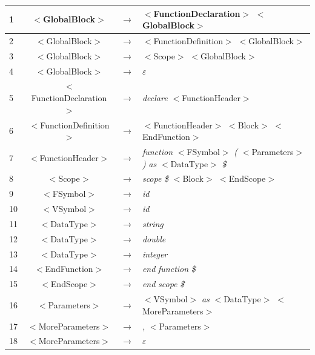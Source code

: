 \documentclass[10pt,a4paper,titlepage]{article}
\begin{document}
{\small
  \begin{center}
    \begin{tabular}{ | l | c  c  l | } \hline
      1  & $<$GlobalBlock$>$              & $\rightarrow$ & $<$FunctionDeclaration$>$ $<$GlobalBlock$>$ \\ \hline
      2  & $<$GlobalBlock$>$              & $\rightarrow$ & $<$FunctionDefinition$>$ $<$GlobalBlock$>$ \\ \hline
      3  & $<$GlobalBlock$>$              & $\rightarrow$ & $<$Scope$>$ $<$GlobalBlock$>$ \\ \hline
      4  & $<$GlobalBlock$>$              & $\rightarrow$ & $\varepsilon$ \\ \hline
      5  & $<$FunctionDeclaration$>$      & $\rightarrow$ & {\it declare} $<$FunctionHeader$>$ \\ \hline
      6  & $<$FunctionDefinition$>$       & $\rightarrow$ & $<$FunctionHeader$>$ $<$Block$>$ $<$EndFunction$>$ \\ \hline
      7  & $<$FunctionHeader$>$           & $\rightarrow$ & {\it function} $<$FSymbol$>$ {\it (} $<$Parameters$>$ {\it )} {\it as} $<$DataType$>$ {\it \$} \\ \hline
      8  & $<$Scope$>$                    & $\rightarrow$ & {\it scope} {\it \$} $<$Block$>$ $<$EndScope$>$ \\ \hline
      9  & $<$FSymbol$>$                  & $\rightarrow$ & {\it id} \\ \hline
      10 & $<$VSymbol$>$                  & $\rightarrow$ & {\it id} \\ \hline
      11 & $<$DataType$>$                 & $\rightarrow$ & {\it string} \\ \hline
      12 & $<$DataType$>$                 & $\rightarrow$ & {\it double} \\ \hline
      13 & $<$DataType$>$                 & $\rightarrow$ & {\it integer} \\ \hline
      14 & $<$EndFunction$>$              & $\rightarrow$ & {\it end} {\it function} {\it \$} \\ \hline
      15 & $<$EndScope$>$                 & $\rightarrow$ & {\it end} {\it scope} {\it \$} \\ \hline
      16 & $<$Parameters$>$               & $\rightarrow$ & $<$VSymbol$>$ {\it as} $<$DataType$>$ $<$MoreParameters$>$ \\ \hline
      17 & $<$MoreParameters$>$           & $\rightarrow$ & {\it ,} $<$Parameters$>$ \\ \hline
      18 & $<$MoreParameters$>$           & $\rightarrow$ & $\varepsilon$ \\ \hline

\end{tabular}
\end{center}}
\end{document}
